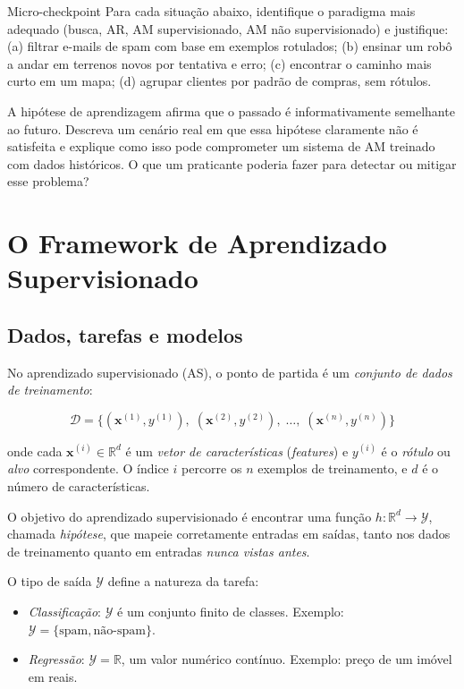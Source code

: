 \documentclass[12pt,a4paper]{article}
\begin{document}
\begin{checkpointbox}{Micro-checkpoint}
Para cada situação abaixo, identifique o paradigma mais adequado (busca, AR, AM supervisionado, AM não supervisionado) e justifique: (a) filtrar e-mails de spam com base em exemplos rotulados; (b) ensinar um robô a andar em terrenos novos por tentativa e erro; (c) encontrar o caminho mais curto em um mapa; (d) agrupar clientes por padrão de compras, sem rótulos.
\end{checkpointbox}

\begin{perguntabox}
A hipótese de aprendizagem afirma que o passado é informativamente semelhante ao futuro. Descreva um cenário real em que essa hipótese claramente não é satisfeita e explique como isso pode comprometer um sistema de AM treinado com dados históricos. O que um praticante poderia fazer para detectar ou mitigar esse problema?
\end{perguntabox}

\section{O Framework de Aprendizado Supervisionado}
\label{sec:framework}

\subsection{Dados, tarefas e modelos}
\label{subsec:dados}

No aprendizado supervisionado (AS), o ponto de partida é um \emph{conjunto de dados de treinamento}:

\[
\mathcal{D} = \{(\mathbf{x}^{(1)}, y^{(1)}),\; (\mathbf{x}^{(2)}, y^{(2)}),\; \ldots,\; (\mathbf{x}^{(n)}, y^{(n)})\}
\]

onde cada $\mathbf{x}^{(i)} \in \mathbb{R}^d$ é um \emph{vetor de características} (\textit{features}) e $y^{(i)}$ é o \emph{rótulo} ou \emph{alvo} correspondente. O índice $i$ percorre os $n$ exemplos de treinamento, e $d$ é o número de características.

O objetivo do aprendizado supervisionado é encontrar uma função $h: \mathbb{R}^d \to \mathcal{Y}$, chamada \emph{hipótese}, que mapeie corretamente entradas em saídas, tanto nos dados de treinamento quanto em entradas \emph{nunca vistas antes}.

O tipo de saída $\mathcal{Y}$ define a natureza da tarefa:

\begin{itemize}
    \item \emph{Classificação}: $\mathcal{Y}$ é um conjunto finito de classes. Exemplo: $\mathcal{Y} = \{\text{spam}, \text{não-spam}\}$.
    \item \emph{Regressão}: $\mathcal{Y} = \mathbb{R}$, um valor numérico contínuo. Exemplo: preço de um imóvel em reais.
\end{itemize}
\end{document}
